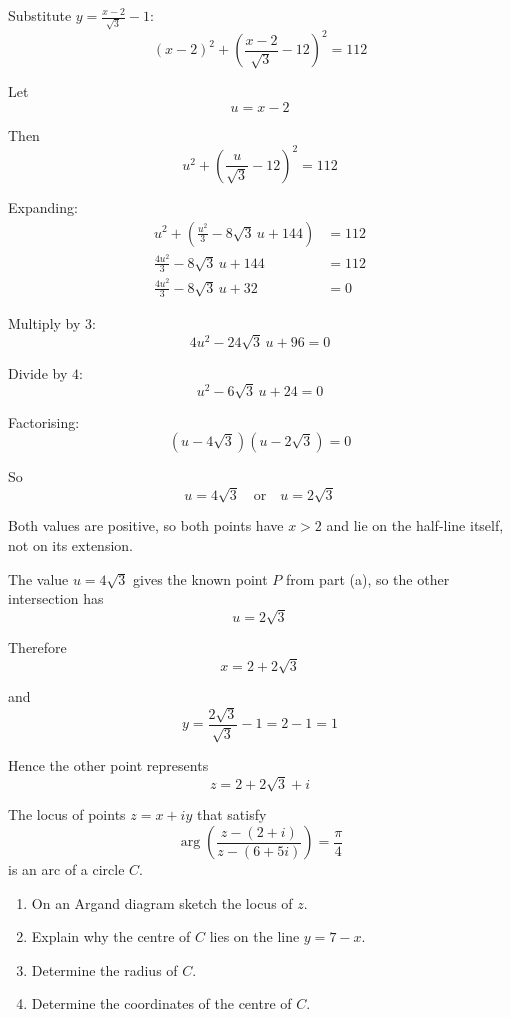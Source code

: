\documentclass[leqno]{article}
\begin{document}
\begin{enumerate}[
  label=\textbf{\arabic*.},
  leftmargin=*,
  topsep=0pt,
  partopsep=0pt,
  parsep=0pt
]
\begin{djsSolution}
\begin{enumerate}[label=\textbf{(\alph*)}]
  Substitute $y=\frac{x-2}{\sqrt{3}}-1$:
  \[
  (x-2)^2+\left(\frac{x-2}{\sqrt{3}}-12\right)^2=112
  \]

  Let
  \[
  u=x-2
  \]

  Then
  \[
  u^2+\left(\frac{u}{\sqrt{3}}-12\right)^2=112
  \]

  Expanding:
  \begin{align*}
  u^2+\left(\frac{u^2}{3}-8\sqrt{3}\,u+144\right)&=112 \\
  \frac{4u^2}{3}-8\sqrt{3}\,u+144&=112 \\
  \frac{4u^2}{3}-8\sqrt{3}\,u+32&=0
  \end{align*}

  Multiply by $3$:
  \[
  4u^2-24\sqrt{3}\,u+96=0
  \]

  Divide by $4$:
  \[
  u^2-6\sqrt{3}\,u+24=0
  \]

  Factorising:
  \[
  (u-4\sqrt{3})(u-2\sqrt{3})=0
  \]

  So
  \[
  u=4\sqrt{3}\quad \text{or}\quad u=2\sqrt{3}
  \]

  Both values are positive, so both points have $x>2$ and lie on the half-line itself, not on its extension.

  The value $u=4\sqrt{3}$ gives the known point $P$ from part (a), so the other intersection has
  \[
  u=2\sqrt{3}
  \]

  Therefore
  \[
  x=2+2\sqrt{3}
  \]

  and
  \[
  y=\frac{2\sqrt{3}}{\sqrt{3}}-1=2-1=1
  \]

  Hence the other point represents
  \[
  z=2+2\sqrt{3}+i
  \]
\end{enumerate}
\end{djsSolution}


\newpage

\questionitem

The locus of points $z=x+iy$ that satisfy
\[
\arg\left(\frac{z-(2+i)}{z-(6+5i)}\right)=\frac{\pi}{4}
\]
is an arc of a circle $C$. \\

\begin{enumerate}[label=\textbf{(\alph*)}]
  \item On an Argand diagram sketch the locus of $z$.  \\
  \item Explain why the centre of $C$ lies on the line $y=7-x$.  \\
  \item Determine the radius of $C$.  \\
  \item Determine the coordinates of the centre of $C$.  \\
\end{enumerate}


\end{enumerate}
\end{document}
